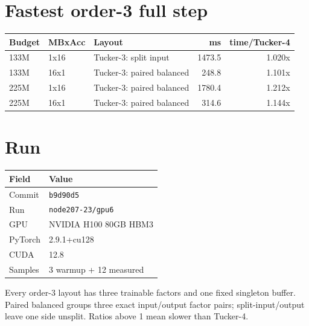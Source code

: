 \documentclass[10pt]{article}
\begin{document}
\section{Fastest order-3 full step}
\begin{center}
\small
\begin{tabular}{lllrr}
\toprule
\textbf{Budget} & \textbf{MBxAcc} & \textbf{Layout} & \textbf{ms} & \textbf{time/Tucker-4} \\
\midrule
133M & 1x16 & Tucker-3: split input & 1473.5 & 1.020x \\
133M & 16x1 & Tucker-3: paired balanced & 248.8 & 1.101x \\
225M & 1x16 & Tucker-3: paired balanced & 1780.4 & 1.212x \\
225M & 16x1 & Tucker-3: paired balanced & 314.6 & 1.144x \\
\bottomrule
\end{tabular}
\end{center}
\section{Run}
\begin{center}
\small
\begin{tabular}{ll}
\toprule
\textbf{Field} & \textbf{Value} \\
\midrule
Commit & \texttt{b9d90d5} \\
Run & \texttt{node207-23/gpu6} \\
GPU & NVIDIA H100 80GB HBM3 \\
PyTorch & 2.9.1+cu128 \\
CUDA & 12.8 \\
Samples & 3 warmup + 12 measured \\
\bottomrule
\end{tabular}
\end{center}
\footnotesize Every order-3 layout has three trainable factors and one fixed singleton buffer. Paired balanced groups three exact input/output factor pairs; split-input/output leave one side unsplit. Ratios above 1 mean slower than Tucker-4.
\end{document}
